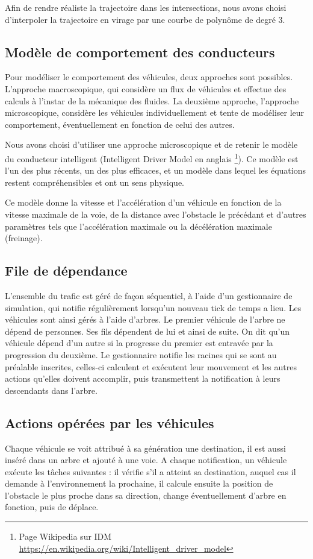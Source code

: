 \documentclass[11pt]{article}
\begin{document}
Afin de rendre réaliste la trajectoire dans les intersections, nous avons choisi d'interpoler la trajectoire en virage par une courbe de polynôme de degré 3. 
\subsection{Modèle de comportement des conducteurs}
Pour modéliser le comportement des véhicules, deux approches sont possibles. L’approche macroscopique, qui considère un flux de véhicules et effectue des calculs à l'instar de la mécanique des fluides. La deuxième approche, l'approche microscopique, considère les véhicules individuellement et tente de modéliser leur comportement, éventuellement en fonction de celui des autres. 

Nous avons choisi d'utiliser une approche microscopique et de retenir le modèle du conducteur intelligent (Intelligent Driver Model en anglais \footnote{Page Wikipedia sur IDM \url{https://en.wikipedia.org/wiki/Intelligent_driver_model}}). Ce modèle est l'un des plus récents, un des plus efficaces, et un modèle dans lequel les équations restent compréhensibles et ont un sens physique.

Ce modèle donne la vitesse et l'accélération d'un véhicule en fonction de la vitesse maximale de la voie, de la distance avec l'obstacle le précédant et d'autres paramètres tels que l'accélération maximale ou la décélération maximale (freinage).

\subsection{File de dépendance}
L'ensemble du trafic est géré de façon séquentiel, à l'aide d'un gestionnaire de simulation, qui notifie régulièrement lorsqu'un nouveau \og tick \fg de temps a lieu. Les véhicules sont ainsi gérés à l'aide d'arbres. Le premier véhicule de l'arbre ne dépend de personnes. Ses fils dépendent de lui et ainsi de suite. On dit qu'un véhicule dépend d'un autre si la progresse du premier est entravée par la progression du deuxième. Le gestionnaire notifie les racines qui se sont au préalable inscrites, celles-ci calculent et exécutent leur mouvement et les autres actions qu'elles doivent accomplir, puis transmettent la notification à leurs descendants dans l'arbre. 

\subsection{Actions opérées par les véhicules}
Chaque véhicule se voit attribué à sa génération une destination, il est aussi inséré dans un arbre et ajouté à une voie. A chaque notification, un véhicule exécute les tâches suivantes : il vérifie s'il a atteint sa destination, auquel cas il demande à l'environnement la prochaine, il calcule ensuite la position de l'obstacle le plus proche dans sa direction, change éventuellement d'arbre en fonction, puis de déplace. 
\end{document}
